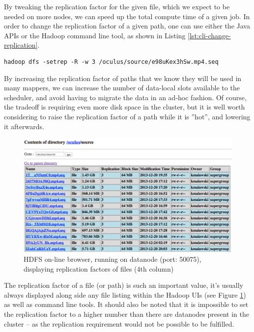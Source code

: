 \newpage
By tweaking the replication factor for the given file, which we expect to be needed on more nodes, we can speed up the total compute time of a given job. In order to change the replication factor of a given path, one can use either the Java APIs or the Hadoop command line tool, as shown in Listing \ref{lst:cli-change-replication}.

\begin{lstlisting}[caption={Explicitly changing the replication factor on a path using command line tools}, label={lst:cli-change-replication}]
hadoop dfs -setrep -R -w 3 /oculus/source/e98uKex3hSw.mp4.seq
\end{lstlisting}

By increasing the replication factor of paths that we know they will be used in many mappers, we can increase the number of data-local slots available to the scheduler, and avoid having to migrate the data in an ad-hoc fashion. Of course, the tradeoff is requiring even more disk space in the cluster, but it is well worth considering to raise the replication factor of a path while it is ''hot'', and lowering it afterwards.

\begin{figure}
  \centering
  \includegraphics[width=\textwidth]{img/hadoop/hdfs_show-replication}
  \caption{HDFS on-line browser, running on datanode (port: 50075), displaying replication factors of files (4th column)}
    \label{fig:hdfs-replication-factors}
\end{figure}

The replication factor of a file (or path) is such an important value, it's usually always displayed along side any file listing within the Hadoop UIs (see Figure \ref{fig:hdfs-replication-factors}) as well as command line tools. It should also be noted that it is impossible to set the replication factor to a higher number than there are datanodes present in the cluster -- as the replication requirement would not be possible to be fulfilled.


